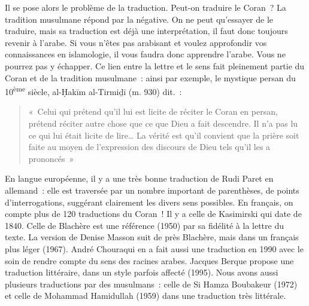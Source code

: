 Il se pose alors le problème de la traduction. Peut-on traduire le
Coran~? La tradition musulmane répond par la négative. On ne peut
qu'essayer de le traduire, mais sa traduction est déjà une
interprétation, il faut donc toujours revenir à l'arabe. Si vous n'êtes
pas arabisant et voulez approfondir vos connaissances en islamologie, il
vous faudra donc apprendre l'arabe. Vous ne pourrez pas y échapper. Ce
lien entre la lettre et le sens fait pleinement partie du Coran et de la
tradition musulmane~: ainsi par exemple, le mystique persan du
10\textsuperscript{ème} siècle, al-Ḥakīm al-Tirmiḏī (m. 930) dit.~:
\begin{quote}
    «~Celui qui prétend qu'il lui est licite de réciter le Coran en persan,
prétend réciter autre chose que ce que Dieu a fait descendre. Il n'a pas
lu ce qui lui était licite de lire\ldots{} La vérité est qu'il convient
que la prière soit faite au moyen de l'expression des discours de Dieu
tels qu'il les a prononcés~»
\end{quote}




{En langue européenne, il y a une très bonne traduction de
Rudi Paret en allemand~: elle est traversée par un nombre important de
parenthèses, de points d'interrogations, suggérant clairement les divers
sens possibles. En français, on compte plus de 120 traductions du
Coran~! Il y a celle de Kasimirski qui date de 1840. Celle de Blachère
est une référence (1950) par sa fidélité à la lettre du texte. La
version de Denise Masson suit de près Blachère, mais dans un français
plus léger (1967). André Chouraqui en a fait aussi une traduction en
1990 avec le soin de rendre compte du sens des racines arabes. Jacques
Berque propose une traduction littéraire, dans un style parfois affecté
(1995). Nous avons aussi plusieurs traductions par des musulmans~: celle
de Si Hamza Boubakeur (1972) et celle de Mohammad Hamidullah (1959) dans
une traduction très
littérale.}

